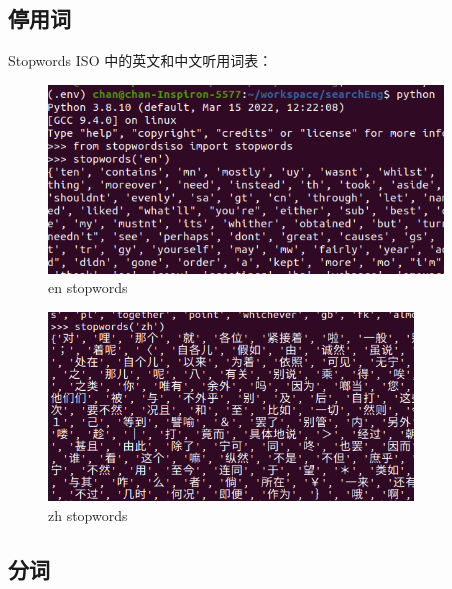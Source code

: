 \documentclass{article}
\begin{document}
\begin{CJK*}{UTF8}{gbsn}
\subsection{停用词}
\qquad Stopwords ISO 中的英文和中文听用词表：

\begin{figure}[H]
\centering
\includegraphics[height=5cm]{stopwords_en.png}
\caption{en stopwords}
\end{figure}

\begin{figure}[H]
\centering
\includegraphics[height=5cm]{stopwords_zh.png}
\caption{zh stopwords}
\end{figure}
\subsection{分词}

\end{CJK*}
\end{document}

